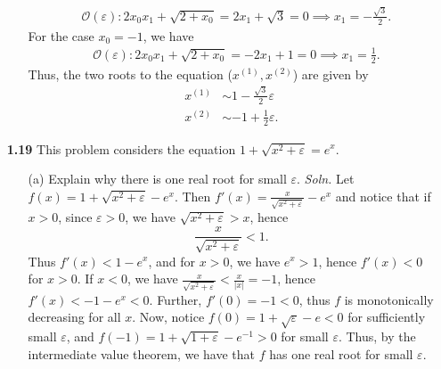 \documentclass{article}
\begin{document}
\begin{itemize}
\begin{itemize}
        \begin{align*}
            &\mathcal{O}(\varepsilon): 2x_0x_1 + \sqrt{2 + x_0} = 2x_1 + \sqrt{3} = 0 \implies x_1 = -\frac{\sqrt{3}}{2}.
        \end{align*}
        For the case $x_0 = -1$, we have
        \begin{align*}
            &\mathcal{O}(\varepsilon): 2x_0x_1 + \sqrt{2 + x_0} = -2x_1 + 1 = 0 \implies x_1 = \frac{1}{2}.
        \end{align*}
        Thus, the two roots to the equation ($x^{(1)}, x^{(2)}$) are given by
        \begin{align*}
            x^{(1)} &\sim 1 - \frac{\sqrt{3}}{2}\varepsilon\\
            x^{(2)} &\sim -1 + \frac{1}{2}\varepsilon.
        \end{align*}
    \end{itemize}

    \pagebreak


    \item[\textbf{1.19}] This problem considers the equation $1 + \sqrt{x^2 + \varepsilon} = e^x$. 
    \begin{itemize}
        \item[(a)] Explain why there is one real root for small $\varepsilon$.
        \newline\newline
        \textit{Soln.} Let $f(x) = 1 + \sqrt{x^2 + \varepsilon} - e^{x}$. Then $f'(x) = \frac{x}{\sqrt{x^2 + \varepsilon}} - e^x$ and notice that if $x > 0$, since $\varepsilon > 0$, we have $\sqrt{x^2 + \varepsilon} > x$, hence
        \[\frac{x}{\sqrt{x^2 + \varepsilon}} < 1.\]
        Thus $f'(x) < 1 - e^x$, and for $x > 0$, we have $e^x > 1$, hence $f'(x) < 0$ for $x > 0$. If $x < 0$, we have $\frac{x}{\sqrt{x^2 + \varepsilon}} < \frac{x}{|x|} = -1$, hence $f'(x) < -1 - e^x < 0$. Further, $f'(0) = -1 < 0$, thus $f$ is monotonically decreasing for all $x$. Now, notice $f(0) = 1 + \sqrt{\varepsilon} - e < 0$ for sufficiently small $\varepsilon$, and $f(-1) = 1 + \sqrt{1 + \varepsilon} - e^{-1} > 0$ for small $\varepsilon$. Thus, by the intermediate value theorem, we have that $f$ has one real root for small $\varepsilon$.
        \newline\newline


\end{itemize}
\end{itemize}
\end{document}

